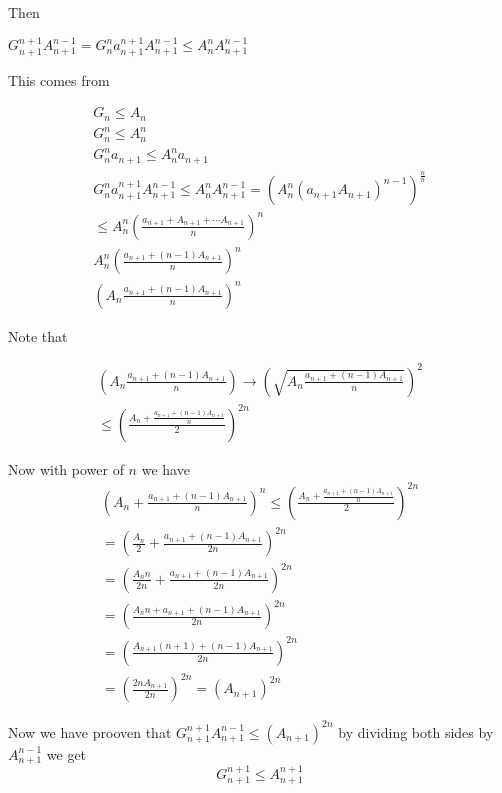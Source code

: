 Then

\(G_{n + 1}^{n + 1}  A_{n + 1}^{n - 1} = G_{n}^{n} a_{n + 1}^{n + 1} A_{n + 1}^{n - 1} \leq A_{n}^{n} A_{n + 1}^{n - 1}\)

This comes from

\begin{align*}
		G_n \leq A_n\\
		G_n^{n} \leq A_n^{n}\\
		G_n^{n} a_{n+1} \leq A_n^{n} a_{n+1}\\
		G_{n}^{n} a_{n + 1}^{n + 1} A_{n + 1}^{n - 1} \leq A_{n}^{n} A_{n + 1}^{n - 1} = \left(A_{n}^{n} \left( a_{n + 1} A_{n +1}\right)^{n -1} \right)^{\frac{n}{n}}\\
		\leq A_{n}^{n} \left( \frac{a_{n + 1} + A_{n + 1} + \cdots A_{n + 1}}{n} \right)^{n}\\
		A_{n}^{n} \left( \frac{a_{n + 1} + (n - 1)A_{n + 1}}{n} \right)^{n}\\
		\left( A_{n} \frac{a_{n + 1} + (n - 1)A_{n + 1}}{n} \right)^{n}
\end{align*}

Note that

\begin{align*}
	\left( A_{n} \frac{a_{n + 1} + (n - 1)A_{n + 1}}{n} \right) \rightarrow  \left( \sqrt{A_{n} \frac{a_{n + 1} + (n - 1)A_{n + 1}}{n}} \right)^{2}\\
	\leq \left( \frac{ A_n + \frac{a_{n + 1} + (n - 1)A_{n + 1}}{n}}{2} \right)^{2n}
\end{align*}

Now with power of \(n\) we have
\begin{align*}
		\left( A_{n} + \frac{a_{n + 1} + (n - 1)A_{n + 1}}{n} \right)^{n} \leq \left( \frac{A_{n} + \frac{a_{n + 1} + (n - 1)A_{n + 1}}{n}}{2} \right)^{2n}\\
		= \left( \frac{A_n}{2} + \frac{a_{n + 1} + (n - 1)A_{n + 1}}{2n}\right)^{2n}\\
		= \left( \frac{A_n n}{2n} + \frac{a_{n + 1} + (n - 1)A_{n + 1}}{2n}\right)^{2n}\\
		= \left( \frac{A_n n  + a_{n + 1} + (n - 1)A_{n + 1}}{2n}\right)^{2n}\\
		= \left( \frac{A_{n + 1}(n + 1) + (n - 1)A_{n + 1}}{2n}\right)^{2n}\\
		= \left( \frac{2n A_{n + 1}}{2n}\right)^{2n} = \left(A_{n + 1}\right)^{2n}
\end{align*}

Now we have prooven that \(G_{n + 1}^{n + 1} A_{n + 1}^{n - 1}\leq \left(A_{n + 1}\right)^{2n}\)
 by dividing both sides by \( A_{n + 1}^{n - 1} \) we get
	\[
		G_{n + 1}^{n + 1}\leq A_{n + 1}^{n + 1}
	\]
\QED

